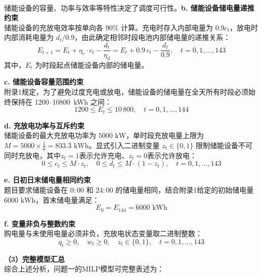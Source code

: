 \documentclass[12pt,a4paper]{ctexart}
\newcommand{\upcite}[1]{\textsuperscript{\cite{#1}}}
\theoremstyle{definition}
\theoremstyle{plain}
\theoremstyle{remark}
\begin{document}
\noindent 储能设备的容量、功率与效率等特性决定了调度可行性\upcite{chen2012microgrid}。\textbf{b. 储能设备储电量递推约束}\\[4pt]
\indent 储能设备的充放电效率按单向各 $90\%$ 计算。充电时存入内部电量为 $0.9 c_t$，放电时内部消耗电量为 $d_t / 0.9$，由此确定相邻时段电池内部储电量的递推关系：
\begin{equation}
  E_{t+1} = E_t + \eta_c \cdot c_t - \frac{d_t}{\eta_d} = E_t + 0.9 \, c_t - \frac{d_t}{0.9}, \quad t = 0, 1, \ldots, 143
  \label{eq:q1_soc_dynamics}
\end{equation}
其中，$E_t$ 为时段起点储能设备内部的储电量。

\noindent\textbf{c. 储能设备容量范围约束}\\[4pt]
\indent 附录1规定，为了避免过度充电或放电，储能设备的储电量在全天所有时段必须始终保持在 1200--10800~kWh 之间：
\begin{equation}
  1200 \leq E_t \leq 10\,800, \quad t = 0, 1, \ldots, 144
  \label{eq:q1_soc_bounds}
\end{equation}

\noindent\textbf{d. 充放电功率与互斥约束}\\[4pt]
\indent 储能设备的最大充放电功率为 $5000\text{ kW}$，单时段充放电量上限为 $M = 5000 \times \frac{1}{6} = 833.\overline{3}\text{ kWh}$。显式引入二进制变量 $z_t \in \{0, 1\}$ 限制储能设备不可同时充放电，其中$z_t=1$表示允许充电、$z_t=0$表示允许放电：
\begin{equation}
  0 \leq c_t \leq M \cdot z_t, \quad 0 \leq d_t \leq M \cdot (1 - z_t), \quad t = 0, 1, \ldots, 143
  \label{eq:q1_charge_discharge_limit}
\end{equation}

\noindent\textbf{e. 日初日末储电量相同约束}\\[4pt]
\indent 题目要求储能设备在 $0:00$ 和 $24:00$ 的储电量相同，结合附录1给定的初始储电量 $6000\text{ kWh}$，首末储电量满足：
\begin{equation}
  E_0 = E_{144} = 6000\text{ kWh}
  \label{eq:q1_boundary}
\end{equation}

\noindent\textbf{f. 变量非负与整数约束}\\[4pt]
\indent 购电量与未使用电量必须非负，充放电状态变量取二进制整数：
\begin{equation}
  q_t \geq 0, \quad w_t \geq 0, \quad z_t \in \{0, 1\}, \quad t = 0, 1, \ldots, 143
  \label{eq:q1_nonneg}
\end{equation}

\noindent\textbf{（3）完整模型汇总}\\[6pt]
\indent 综合上述分析，问题一的MILP模型可完整表述为：
\end{document}
